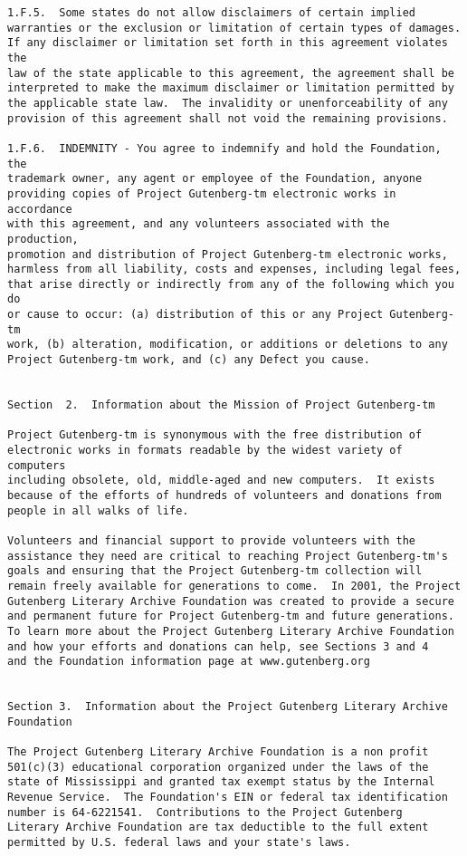 \documentclass[oneside]{book}
\begin{document}
\begin{verbatim}
1.F.5.  Some states do not allow disclaimers of certain implied
warranties or the exclusion or limitation of certain types of damages.
If any disclaimer or limitation set forth in this agreement violates the
law of the state applicable to this agreement, the agreement shall be
interpreted to make the maximum disclaimer or limitation permitted by
the applicable state law.  The invalidity or unenforceability of any
provision of this agreement shall not void the remaining provisions.

1.F.6.  INDEMNITY - You agree to indemnify and hold the Foundation, the
trademark owner, any agent or employee of the Foundation, anyone
providing copies of Project Gutenberg-tm electronic works in accordance
with this agreement, and any volunteers associated with the production,
promotion and distribution of Project Gutenberg-tm electronic works,
harmless from all liability, costs and expenses, including legal fees,
that arise directly or indirectly from any of the following which you do
or cause to occur: (a) distribution of this or any Project Gutenberg-tm
work, (b) alteration, modification, or additions or deletions to any
Project Gutenberg-tm work, and (c) any Defect you cause.


Section  2.  Information about the Mission of Project Gutenberg-tm

Project Gutenberg-tm is synonymous with the free distribution of
electronic works in formats readable by the widest variety of computers
including obsolete, old, middle-aged and new computers.  It exists
because of the efforts of hundreds of volunteers and donations from
people in all walks of life.

Volunteers and financial support to provide volunteers with the
assistance they need are critical to reaching Project Gutenberg-tm's
goals and ensuring that the Project Gutenberg-tm collection will
remain freely available for generations to come.  In 2001, the Project
Gutenberg Literary Archive Foundation was created to provide a secure
and permanent future for Project Gutenberg-tm and future generations.
To learn more about the Project Gutenberg Literary Archive Foundation
and how your efforts and donations can help, see Sections 3 and 4
and the Foundation information page at www.gutenberg.org


Section 3.  Information about the Project Gutenberg Literary Archive
Foundation

The Project Gutenberg Literary Archive Foundation is a non profit
501(c)(3) educational corporation organized under the laws of the
state of Mississippi and granted tax exempt status by the Internal
Revenue Service.  The Foundation's EIN or federal tax identification
number is 64-6221541.  Contributions to the Project Gutenberg
Literary Archive Foundation are tax deductible to the full extent
permitted by U.S. federal laws and your state's laws.


\end{verbatim}
\end{document}
